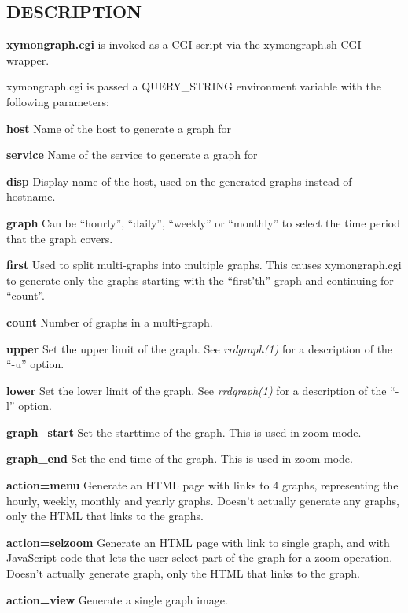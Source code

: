  
\subsection{DESCRIPTION}
\textbf{xymongraph.cgi}
 is invoked as a CGI script via the xymongraph.sh CGI wrapper. 

  xymongraph.cgi is passed a QUERY\_STRING environment variable with the following parameters: 


 \textbf{host}
 Name of the host to generate a graph for 


 \textbf{service}
 Name of the service to generate a graph for 


 \textbf{disp}
 Display-name of the host, used on the generated graphs instead of hostname. 


 \textbf{graph}
 Can be ``hourly'', ``daily'', ``weekly'' or ``monthly'' to select the time period that the graph covers. 


 \textbf{first}
 Used to split multi-graphs into multiple graphs. This causes xymongraph.cgi to generate only the graphs starting with the ``first'th'' graph and continuing for ``count''. 


 \textbf{count}
 Number of graphs in a multi-graph. 


 \textbf{upper}
 Set the upper limit of the graph. See \emph{rrdgraph(1)}
 for a description of the ``-u'' option. 


 \textbf{lower}
 Set the lower limit of the graph. See \emph{rrdgraph(1)}
 for a description of the ``-l'' option. 


 \textbf{graph\_start}
 Set the starttime of the graph. This is used in zoom-mode. 


 \textbf{graph\_end}
 Set the end-time of the graph. This is used in zoom-mode. 


 \textbf{action=menu}
 Generate an HTML page with links to 4 graphs, representing the hourly, weekly, monthly and yearly graphs. Doesn't actually generate any graphs, only the HTML that links to the graphs. 


 \textbf{action=selzoom}
 Generate an HTML page with link to single graph, and with JavaScript code that lets the user select part of the graph for a zoom-operation. Doesn't actually generate graph, only the HTML that links to the graph. 


 \textbf{action=view}
 Generate a single graph image. 


 
